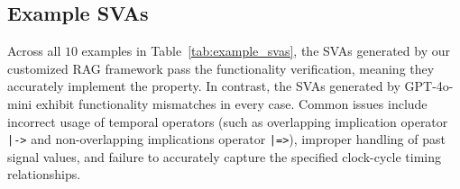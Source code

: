 \subsection{Example SVAs}
\label{subsec:Example-SVAs}
Across all $10$ examples in Table~\ref{tab:example_svas}, the SVAs generated by our customized RAG framework pass the functionality verification, meaning they accurately implement the property. In contrast, the SVAs generated by GPT-4o-mini exhibit functionality mismatches in every case.  Common issues include incorrect usage of temporal operators (such as overlapping implication operator \texttt{|->} and non-overlapping implications operator \texttt{|=>}), improper handling of past signal values, and failure to accurately capture the specified clock-cycle timing relationships.
